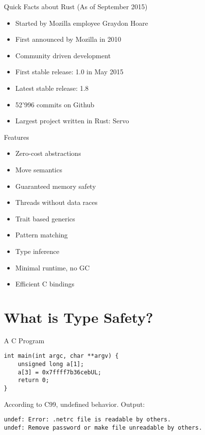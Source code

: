 \documentclass[aspectratio=1610,t]{beamer}
\begin{document}
\begin{frame}{Quick Facts about Rust}
	(As of September 2015)
	\begin{itemize}
		\item Started by Mozilla employee Graydon Hoare
		\item First announced by Mozilla in 2010
		\item Community driven development
		\item First stable release: 1.0 in May 2015
		\item Latest stable release: 1.8
		\item 52'996 commits on Github
		\item Largest project written in Rust: Servo
	\end{itemize}
\end{frame}


\begin{frame}{Features}
	\begin{itemize}
		\item Zero-cost abstractions
		\item Move semantics
		\item Guaranteed memory safety
		\item Threads without data races
		\item Trait based generics
		\item Pattern matching
		\item Type inference
		\item Minimal runtime, no GC
		\item Efficient C bindings
	\end{itemize}
\end{frame}


\section{What is Type Safety?}


\begin{frame}[fragile]{A C Program}
\begin{verbatim}
int main(int argc, char **argv) {
    unsigned long a[1];
    a[3] = 0x7ffff7b36cebUL;
    return 0;
}
\end{verbatim}
	According to C99, undefined behavior. Output:

	{\footnotesize \tt undef: Error: .netrc file is readable by others.\\
	undef: Remove password or make file unreadable by others.}
\end{frame}
\end{document}
